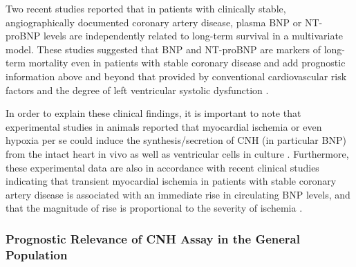\documentclass[14pt,a4paper,onecolumn]{extarticle}
\begin{document}
Two recent studies reported that in patients with clinically stable, angiographically
documented coronary artery disease, plasma BNP \citep{bib3241} or NT-proBNP \citep{bib3242} levels are
independently related to long-term survival in a multivariate model. These studies suggested that BNP and NT-proBNP are markers of long-term mortality even in patients
with stable coronary disease and add prognostic information above and beyond that provided by conventional cardiovascular risk factors and the degree of left ventricular systolic dysfunction \citep{bib3241} \citep{bib3242}.

In order to explain these clinical findings, it is important to note that experimental
studies in animals reported that myocardial ischemia or even hypoxia per se could
induce the synthesis/secretion of CNH (in particular BNP) from the intact heart in vivo
as well as ventricular cells in culture \citep{bib3243} \citep{bib3244}. Furthermore, these experimental data
are also in accordance with recent clinical studies indicating that transient myocardial
ischemia in patients with stable coronary artery disease is associated with an immediate rise in circulating BNP levels, and that the magnitude of rise is proportional to the
severity of ischemia \citep{bib3163} \citep{bib3164} \citep{bib3246}.


\subsubsection{ Prognostic Relevance of CNH Assay in the General Population}
\end{document}
